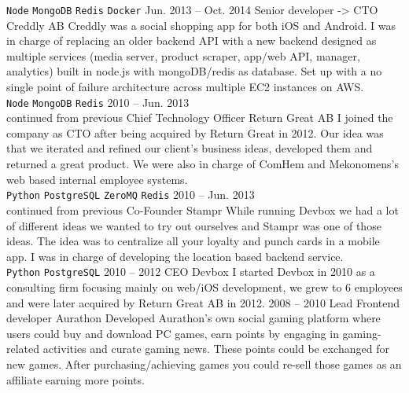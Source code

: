 \documentclass[9pt]{template} %
\begin{document}
\begin{entrylist}
{      \texttt{Node}\slashsep
      \texttt{MongoDB}\slashsep
      \texttt{Redis}\slashsep
      \texttt{Docker}
    }
  \entry
    {Jun. 2013 -- Oct. 2014}
    {Senior developer -> CTO}
    {Creddly AB}
    {
      Creddly was a social shopping app for both iOS and Android. I was in charge of replacing an
      older backend API with a new backend designed as multiple services (media server, product
      scraper, app/web API, manager, analytics) built in node.js with mongoDB/redis as database.
      Set up with a no single point of failure architecture across multiple EC2 instances on AWS.\\
      \texttt{Node}\slashsep
      \texttt{MongoDB}\slashsep
      \texttt{Redis}
    }
  \entry
    {2010 -- Jun. 2013\\\footnotesize{continued from previous}}
    {Chief Technology Officer}
    {Return Great AB}
    {
      I joined the company as CTO after being acquired by Return Great in 2012. Our idea was that
      we iterated and refined our client's business ideas, developed them and returned a great product.
      We were also in charge of ComHem and Mekonomens’s web based internal employee systems.\\
      \texttt{Python}\slashsep
      \texttt{PostgreSQL}\slashsep
      \texttt{ZeroMQ}\slashsep
      \texttt{Redis}
    }
  \entry
    {2010 -- Jun. 2013\\\footnotesize{continued from previous}}
    {Co-Founder}
    {Stampr}
    {
      While running Devbox we had a lot of different ideas we wanted to try out ourselves and Stampr
      was one of those ideas. The idea was to centralize all your loyalty and punch cards in a mobile
      app. I was in charge of developing the location based backend service.\\
      \texttt{Python}\slashsep
      \texttt{PostgreSQL}
    }
  \entry
    {2010 -- 2012}
    {CEO}
    {Devbox}
    {
      I started Devbox in 2010 as a consulting firm focusing mainly on web/iOS development, we grew to
      6 employees and were later acquired by Return Great AB in 2012.
    }
  \entry
    {2008 -- 2010}
    {Lead Frontend developer}
    {Aurathon}
    {
      Developed Aurathon’s own social gaming platform where users could buy and download PC games, earn
      points by engaging in gaming-related activities and curate gaming news. These points could be
      exchanged for new games. After purchasing/achieving games you could re-sell those games as an
      affiliate earning more points.\\

}
\end{entrylist}
\end{document}
